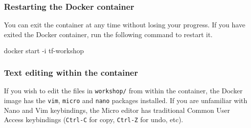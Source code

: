 \subsubsection{Restarting the Docker container}
You can exit the container at any time without losing your progress.
If you have exited the Docker container, run the following command to restart it.
\begin{shell}
docker start -i tf-workshop
\end{shell}

\subsubsection{Text editing within the container}
If you wish to edit the files in \texttt{workshop/} from within the container,
the Docker image has the \texttt{vim}, \texttt{micro} and \texttt{nano} packages installed.
If you are unfamiliar with Nano and Vim keybindings, the Micro editor
has traditional Common User Access keybindings (\texttt{Ctrl-C} for copy,
\texttt{Ctrl-Z} for undo, etc).
